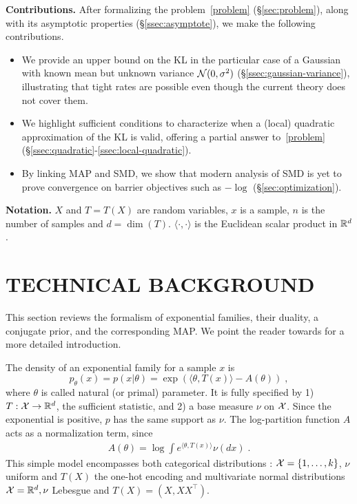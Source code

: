 \documentclass[twoside]{article}
\let\oldsection\section
\renewcommand{\section}[1]{\oldsection{\texorpdfstring{\uppercase{#1}}{#1}}}
\newcommand{\logpart}{A}
\newcommand{\nat}{\theta}
\begin{document}
{\bf Contributions.}
After formalizing the problem~\eqref{problem} (\S\ref{sec:problem}), along with its asymptotic properties (\S\ref{ssec:asymptote}), we make the following contributions.
\begin{itemize}
	\itemsep0em
	\item We provide an upper bound on the KL in the particular case of a Gaussian with known mean but unknown variance ${\mathcal N}(0,\sigma^2)$ (\S\ref{ssec:gaussian-variance}), illustrating that tight rates are possible even though the current theory does not cover them.
	\item We highlight sufficient conditions to characterize when a (local) quadratic approximation of the KL is valid, offering a partial answer to~\eqref{problem} (\S\ref{ssec:quadratic}-\ref{ssec:local-quadratic}).
	\item By linking MAP and SMD, we show that modern analysis of SMD is yet to prove convergence on barrier objectives such as $-\log$ (\S\ref{sec:optimization}).
\end{itemize}


{\bf Notation.}
$X$ and $T=T(X)$ are random variables, $x$ is a sample, $n$ is the number of samples and $d= \dim(T)$.
$\langle \cdot , \cdot \rangle$ is the Euclidean scalar product in $\mathbb{R}^d$.


\section{Technical background}
\label{sec:background}
This section reviews the formalism of exponential families, their duality, a conjugate prior, and the corresponding MAP.
We point the reader towards \citet[Chapter 3]{wainwright2008graphical} for a more detailed introduction.


The density of an exponential family for a sample $x$ is
\begin{equation}
	 p_\nat(x) = p(x|\nat) = \exp( \langle \nat, T(x) \rangle - \logpart(\nat)) \; ,
	 \label{eq:def_expfamily}
\end{equation}
where  $\nat$ is called natural (or primal) parameter.
It is fully specified by 1) $T: {\mathcal X} \rightarrow \mathbb{R}^d$, the sufficient statistic,
and 2) a base measure $\nu$ on ${\mathcal X}$.
Since the exponential is positive, $p$ has the same support as $\nu$.
The log-partition function $\logpart$ acts as a normalization term, since
\begin{align}
    \logpart(\nat) = \log \int e^{\langle \nat, T(x) \rangle} \nu(dx) \;.
\end{align}
This simple model encompasses both categorical distributions : ${\mathcal X} = \{1, \dots, k\}$, $\nu$ uniform and $T(X)$  the one-hot encoding and multivariate normal distributions ${\mathcal X}=\mathbb{R}^d, \nu$ Lebesgue and $T(X)=(X, X X^\top)$.
\end{document}
